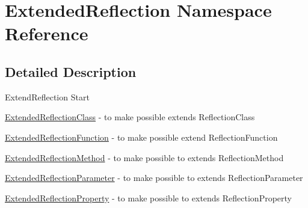 \hypertarget{namespace_extended_reflection}{
\section{ExtendedReflection Namespace Reference}
\label{namespace_extended_reflection}
}


\subsection{Detailed Description}
ExtendReflection Start

\hyperlink{class_extended_reflection_class}{ExtendedReflectionClass} - to make possible extends ReflectionClass

\hyperlink{class_extended_reflection_function}{ExtendedReflectionFunction} - to make possible extend ReflectionFunction

\hyperlink{class_extended_reflection_method}{ExtendedReflectionMethod} - to make possible to extends ReflectionMethod

\hyperlink{class_extended_reflection_parameter}{ExtendedReflectionParameter} - to make possible to extends ReflectionParameter

\hyperlink{class_extended_reflection_property}{ExtendedReflectionProperty} - to make possible to extends ReflectionProperty 

